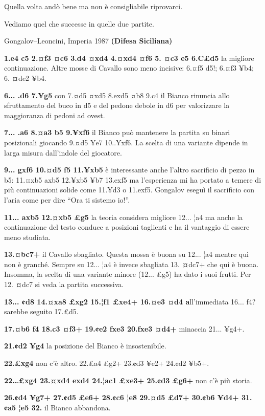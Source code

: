 Quella volta andò bene ma non è consigliabile riprovarci.

Vediamo quel che successe in quelle due partite.

Gongalov--Leoncini, Imperia 1987 \textbf{(Difesa Siciliana)}

\textbf{1.e4 c5 2.¤f3 ¤c6 3.d4 ¤xd4 4.¤xd4 ¤f6 5. ¤c3 e5 6.C£d5} la
migliore continuazione. Altre mosse di Cavallo sono meno incisive: 6.¤f5
d5!; 6.¤f3 ¥b4; 6. \textbf{¤}de2 ¥b4.

\textbf{6... .d6 7.¥g5} con 7.¤d5 ¤xd5 8.exd5 ¤b8 9.c4 il Bianco
rinuncia allo sfruttamento del buco in d5 e del pedone debole in d6 per
valorizzare la maggioranza di pedoni ad ovest.

\textbf{7... .a6 8.¤a3 b5 9.¥xf6} il Bianco può mantenere la partita su
binari posizionali giocando 9.¤d5 ¥e7 10..¥xf6. La scelta di una
variante dipende in larga misura dall'indole del giocatore.

\textbf{9... gxf6 10.¤d5 f5 11.¥xb5} è interessante anche l'altro
sacrificio di pezzo in b5: 11.¤xb5 axb5 12.¥xb5 ¥b7 13.exf5 ma
l'esperienza mi ha portato a temere di più continuazioni solide come
11.¥d3 o 11.exf5. Gongalov eseguì il sacrificio con l'aria come per dire
``Ora ti sistemo io!''.

\textbf{11... axb5 12.¤xb5 £g5} la teoria considera migliore 12... ¦a4
ma anche la continuazione del testo conduce a posizioni taglienti e ha
il vantaggio di essere meno studiata.


\textbf{13.¤bc7+} il Cavallo sbagliato. Questa mossa è buona su 12...
¦a4 mentre qui non è granché. Sempre su 12... ¦a4 è invece sbagliata 13.
\textbf{¤}dc7+ che qui è buona. Insomma, la scelta di una variante
minore (12... £g5) ha dato i suoi frutti. Per 12. \textbf{¤}dc7 si veda
la partita successiva.

\textbf{13... ¢d8 14.¤xa8 £xg2 15.¦f1 £xe4+ 16.¤e3 ¤d4 a}ll'immediata
16... f4? sarebbe seguito 17.£d5.

\textbf{17.¤b6 f4 18.c3 ¤f3+ 19.¢e2 fxe3 20.fxe3 ¤d4+} minaccia 21...
¥g4+.

\textbf{21.¢d2 ¥g4} la posizione del Bianco è insostenibile.

\textbf{22.£xg4} non c'è altro. 22.£a4 £g2+ 23.¢d3 ¥e2+ 24.¢d2 ¥b5+.

\textbf{22\ldots£xg4 23.¤xd4 exd4 24.¦ac1 £xe3+ 25.¢d3 £g6+} non c'è più
storia.

\textbf{26.¢d4 ¥g7+ 27.¢d5 £e6+ 28.¢c6 ¦e8 29.¤d5 £d7+ 30.¢b6 ¥d4+
31.¢a5 ¦e5 32.} il Bianco abbandona.

